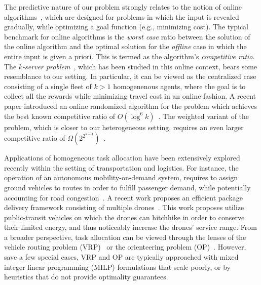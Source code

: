\documentclass[conference]{IEEEtran}
\begin{document}
The predictive nature of our problem strongly relates to the notion of online algorithms~\cite{FiatWoeginger98,BorodinElYaniv05,HentenryckBent09}, which are designed for problems in which the input is  revealed gradually, while optimizing a goal function (e.g., minimizing cost). The typical benchmark for online algorithms is the \emph{worst case} ratio between the solution of the online algorithm and the optimal solution for the \emph{offline} case in which the entire input is given a priori. This is termed as the algorithm's \emph{competitive ratio}. The \emph{$k$-server problem}~\cite{Koutsoupias09,BertsimasETAL19}, which has been studied in this online context, bears some resemblance to our setting. In particular, it can be viewed as the centralized case consisting of a single fleet of $k>1$ homogenenous agents, where the goal is to collect all the rewards while minimizing travel cost in an online fashion. A recent paper introduced an online randomized algorithm for the problem which achieves the best known competitive ratio of $O(\log^6 k)$~\cite{Lee18}. The weighted variant of the problem, which is closer to our heterogeneous setting, requires an even larger competitive ratio of $\Omega(2^{2^{k-4}})$~\cite{BansalETAL17}. 

Applications of homogeneous task allocation have been extensively explored recently within the setting of transportation and logistics. For instance, the operation of an autonomous mobility-on-demand system, requires to assign ground vehicles to routes in order to fulfill passenger demand, while potentially accounting for road congestion~\cite{SoloveyETAL19,WallerETAL18,Levine17}. A recent work proposes an efficient package delivery framework consisting of multiple drones~\cite{ChoudhurySoloveyETAL2020}. This work proposes utilize public-transit vehicles on which the drones can hitchhike in order to conserve their limited energy, and thus noticeably increase the drones' service range. From a broader perspective, task allocation can  be viewed through the lenses of the vehicle routing problem (VRP)~\cite{TothVigo2014} or the orienteering problem (OP)~\cite{GunawanETAL16}. %
However, save a few special cases, VRP and OP  are typically approached with mixed integer linear programming (MILP) formulations that scale poorly, or by heuristics that do not provide optimality guarantees.
\end{document}
